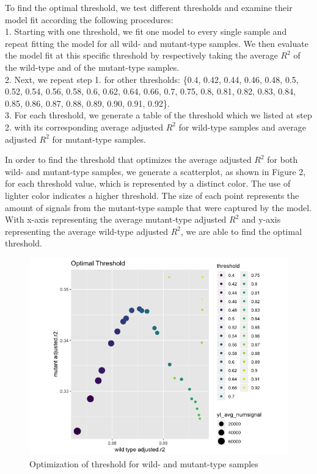 \documentclass[10pt,letterpaper]{article}
\begin{document}
To find the optimal threshold, we test different thresholds and examine
their model fit according the following procedures:\\
1. Starting with one threshold, we fit one model to every single sample
and repeat fitting the model for all wild- and mutant-type samples. We
then evaluate the model fit at this specific threshold by respectively
taking the average \(R^2\) of the wild-type and of the mutant-type
samples.\\
2. Next, we repeat step 1. for other thresholds: \{0.4, 0.42, 0.44,
0.46, 0.48, 0.5, 0.52, 0.54, 0.56, 0.58, 0.6, 0.62, 0.64, 0.66, 0.7,
0.75, 0.8, 0.81, 0.82, 0.83, 0.84, 0.85, 0.86, 0.87, 0.88, 0.89, 0.90,
0.91, 0.92\}.\\
3. For each threshold, we generate a table of the threshold which we
listed at step 2. with its corresponding average adjusted \(R^2\) for
wild-type samples and average adjusted \(R^2\) for mutant-type samples.

In order to find the threshold that optimizes the average adjusted
\(R^2\) for both wild- and mutant-type samples, we generate a
scatterplot, as shown in Figure 2, for each threshold value, which is
represented by a distinct color. The use of lighter color indicates a
higher threshold. The size of each point represents the amount of
signals from the mutant-type sample that were captured by the model.
With x-axis representing the average mutant-type adjusted \(R^2\) and
y-axis representing the average wild-type adjusted \(R^2\), we are able
to find the optimal threshold.

\begin{figure}[H]
\includegraphics[width=0.9\linewidth]{visualization_paper/optimal_threshold2} \caption{Optimization of threshold for wild- and mutant-type samples}\label{fig:Figure2}
\end{figure}
\end{document}
